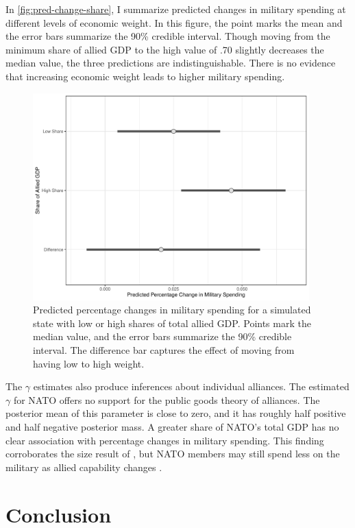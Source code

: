 \documentclass[12pt]{article}
\begin{document}
In \autoref{fig:pred-change-share}, I summarize predicted changes in military spending at different levels of economic weight. 
In this figure, the point marks the mean and the error bars summarize the 90\% credible interval. 
Though moving from the minimum share of allied GDP to the high value of .70 slightly decreases the median value, the three predictions are indistinguishable. 
There is no evidence that increasing economic weight leads to higher military spending. 

\begin{figure}[htbp]
	\centering
		\includegraphics[width=0.95\textwidth]{pred-change-share.pdf}
	\caption{Predicted percentage changes in military spending for a simulated state with low or high shares of total allied GDP. Points mark the median value, and the error bars summarize the 90\% credible interval. The difference bar captures the effect of moving from having low to high weight.}
	\label{fig:pred-change-share}
\end{figure}


The $\gamma$ estimates also produce inferences about individual alliances.
The estimated $\gamma$ for NATO offers no support for the public goods theory of alliances. 
The posterior mean of this parameter is close to zero, and it has roughly half positive and half negative posterior mass.  
A greater share of NATO's total GDP has no clear association with percentage changes in military spending. 
This finding corroborates the size result of \citet{PluemperNeumayer2015}, but NATO members may still spend less on the military as allied capability changes \citep{GeorgeSandler2017}.


\section{Conclusion}
\end{document}
